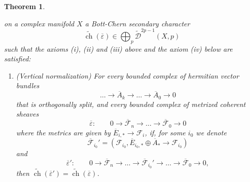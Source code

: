\documentclass[10pt,twoside]{article}
\numberwithin{equation}{section}
\theoremstyle{plain}
\newtheorem{theorem}[equation]{Theorem}
\theoremstyle{definition}
\DeclareMathOperator{\ch}{ch}
\begin{document}
\begin{theorem}
\begin{enumerate}
$$    $$ on a complex manifold $X$
    a Bott-Chern secondary character
    $$\widetilde{\ch}(\overline{\varepsilon})\in
    \bigoplus_{p}\widetilde{\mathcal{D}}^{2p-1}(X,p)$$   
    such that the axioms (i), (ii) and
    (iii) above and the 
    axiom (iv) below are 
    satisfied:
    \begin{enumerate}
    \item [(iv)] (Vertical normalization) For every bounded complex of
      hermitian vector bundles 
      \begin{displaymath}
        \dots \rightarrow \overline A_{k}\rightarrow
        \dots \rightarrow \overline A_{0}\rightarrow 0
      \end{displaymath}
      that is orthogonally split,
      and every bounded complex of metrized coherent sheaves
    $$\overline{\varepsilon}\colon\qquad 0\to 
    \overline{\mathcal{F}}_{n} \to \dots
    \to \overline{\mathcal{F}}_0 \to 0
    $$
    where the metrics are given by $\overline E_{i,\ast}\rightarrow
    \mathcal{F}_{i}$, if, for some $i_{0}$ we denote
    \begin{displaymath}
      \overline {\mathcal{F}}_{i_{0}}'=(\mathcal{F}_{i_{0}},
      \overline E_{i_{0},\ast}\oplus \overline A_{\ast}\rightarrow
      \mathcal{F}_{i_{0}})
    \end{displaymath}
    and
    $$\overline{\varepsilon}'\colon\qquad 0\to 
    \overline{\mathcal{F}}_{n} \to \dots \to \overline
    {\mathcal{F}}_{i_{0}}' \to \dots
    \to \overline{\mathcal{F}}_0 \to 0,
    $$
    then $\widetilde{\ch}(\overline{\varepsilon }')=
    \widetilde{\ch}(\overline{\varepsilon })$.
    \end{enumerate}
  \end{enumerate}
\end{theorem}
\end{document}
